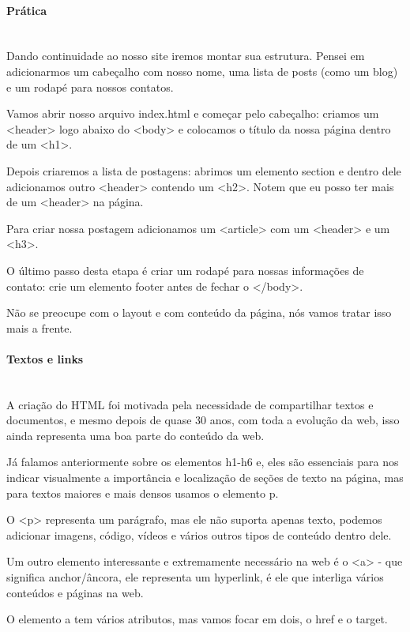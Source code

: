 \documentclass[12pt,a4paper]{article}
\begin{document}
	\paragraph{Prática} \mbox{} \\
	
	Dando continuidade ao nosso site iremos montar sua estrutura. Pensei em adicionarmos um cabeçalho com nosso nome, uma lista de posts (como um blog) e um rodapé para nossos contatos.
	
	Vamos abrir nosso arquivo index.html e começar pelo cabeçalho: criamos um <header> logo abaixo do <body> e colocamos o título da nossa página dentro de um <h1>.
	
	Depois criaremos a lista de postagens: abrimos um elemento section e dentro dele adicionamos outro <header> contendo um <h2>. Notem que eu posso ter mais de um <header> na página.
	
	Para criar nossa postagem adicionamos um <article> com um <header> e um <h3>.
	
	O último passo desta etapa é criar um rodapé para nossas informações de contato: crie um elemento footer antes de fechar o </body>.
	
	Não se preocupe com o layout e com conteúdo da página, nós vamos tratar isso mais a frente.
	
	\paragraph{Textos e links} \mbox{} \\
	
	A criação do HTML foi motivada pela necessidade de compartilhar textos e documentos, e mesmo depois de quase 30 anos, com toda a evolução da web, isso ainda representa uma boa parte do conteúdo da web.
	
	Já falamos anteriormente sobre os elementos h1-h6 e, eles são essenciais para nos indicar visualmente a importância e localização de seções de texto na página, mas para textos maiores e mais densos usamos o elemento p.
	
	O <p> representa um parágrafo, mas ele não suporta apenas texto, podemos adicionar imagens, código, vídeos e vários outros tipos de conteúdo dentro dele.
	
	Um outro elemento interessante e extremamente necessário na web é o <a> - que significa anchor/âncora, ele representa um hyperlink, é ele que interliga vários conteúdos e páginas na web.
	
	O elemento a tem vários atributos, mas vamos focar em dois, o href e o target.
	
\end{document}
